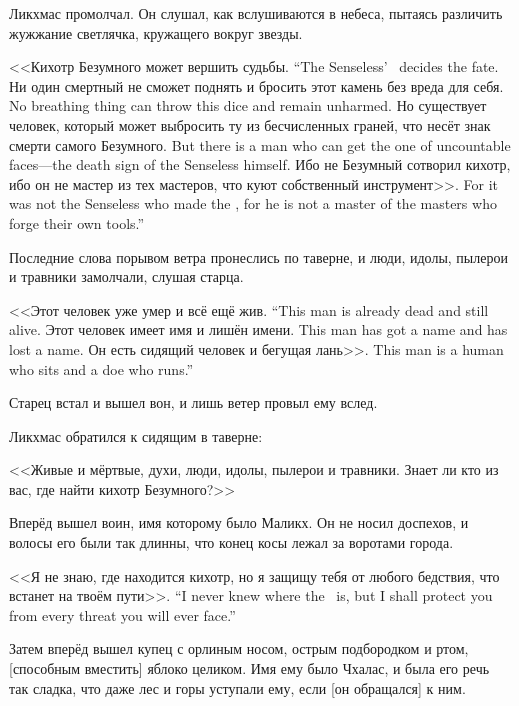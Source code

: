 Ликхмас промолчал.
Он слушал, как вслушиваются в небеса, пытаясь различить жужжание светлячка, кружащего вокруг звезды.

{<<Кихотр Безумного может вершить судьбы.}
{``The Senseless' \Kihotr\ decides the fate.}
{Ни один смертный не сможет поднять и бросить этот камень без вреда для себя.}
{No breathing thing can throw this dice and remain unharmed.}
{Но существует человек, который может выбросить ту из бесчисленных граней, что несёт знак смерти самого Безумного.}
{But there is a man who can get the one of uncountable faces---the death sign of the Senseless himself.}
{Ибо не Безумный сотворил кихотр, ибо он не мастер из тех мастеров, что куют собственный инструмент>>.}
{For it was not the Senseless who made the \Kihotr, for he is not a master of the masters who forge their own tools.''}

Последние слова порывом ветра пронеслись по таверне, и люди, идолы, пылерои и травники замолчали, слушая старца.

{<<Этот человек уже умер и всё ещё жив.}
{``This man is already dead and still alive.}
{Этот человек имеет имя и лишён имени.}
{This man has got a name and has lost a name.}
{Он есть сидящий человек и бегущая лань>>.}
{This man is a human who sits and a doe who runs.''}

Старец встал и вышел вон, и лишь ветер провыл ему вслед.

Ликхмас обратился к сидящим в таверне:

<<Живые и мёртвые, духи, люди, идолы, пылерои и травники.
Знает ли кто из вас, где найти кихотр Безумного?>>

Вперёд вышел воин, имя которому было Маликх\FM.
Он не носил доспехов, и волосы его были так длинны, что конец косы лежал за воротами города\FM.

{<<Я не знаю, где находится кихотр, но я защищу тебя от любого бедствия, что встанет на твоём пути>>.}
{``I never knew where the \Kihotr\ is, but I shall protect you from every threat you will ever face.''}

Затем вперёд вышел купец с орлиным носом, острым подбородком и ртом, [способным вместить] яблоко целиком.
Имя ему было Чхалас, и была его речь так сладка, что даже лес и горы уступали ему, если [он обращался] к ним.

